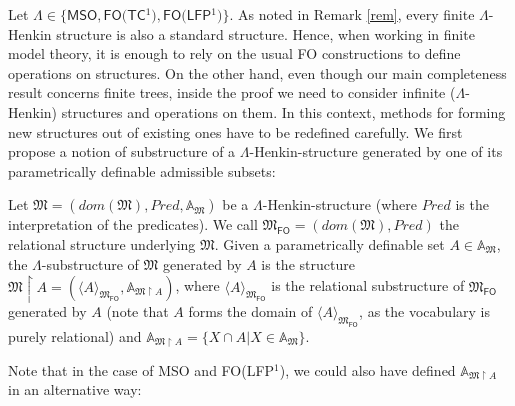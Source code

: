\documentclass{LMCS}
\newcommand{\frM}{\mathfrak{M}}
\newcommand{\fo}{\textsf{FO}\xspace}
\newcommand{\mso}{\textsf{MSO}\xspace}
\newcommand{\fotc}{\textsf{FO(TC$^1$)}\xspace}
\newcommand{\folfp}{\textsf{FO(LFP$^1$)}\xspace}
\begin{document}
Let $\Lambda \in \{\mso,\fotc,\folfp\}$. As noted in Remark \ref{rem}, every finite $\Lambda$-Henkin structure is also a standard structure.
Hence, when working in finite model theory, it is enough to rely on the usual \fo constructions to define operations on structures.
On the other hand, even though our main completeness result concerns finite trees, inside the proof we need to consider infinite ($\Lambda$-Henkin) structures and operations on them. In this context, methods for forming new structures out of existing ones have to be redefined carefully.
We first propose a notion of substructure of a $\Lambda$-Henkin-structure
generated by one of its parametrically definable admissible subsets:
\begin{defi}
    Let $\frM=(dom(\frM),Pred,\mathbb{A}_\frM)$ be a $\Lambda$-Henkin-structure (where $Pred$ is the interpretation of the predicates). We
    call $\frM_\fo=(dom(\frM), Pred)$ the relational structure underlying $\frM$. Given a parametrically definable set $A \in \mathbb{A}_\frM$, the
    $\Lambda$-substructure of $\frM$ generated by $A$ is the structure $\frM \upharpoonright A=(\langle A \rangle_{\frM_\fo},\mathbb{A}_{\frM \upharpoonright A})$,
where $\langle A \rangle_{\frM_\fo}$ is the relational substructure of
$\frM_\fo$ generated by $A$ (note that $A$ forms the domain of
$\langle A \rangle_{\frM_\fo}$, as the vocabulary is purely
relational) and $\mathbb{A}_{\frM \upharpoonright A}= \{X \cap A | X \in \mathbb{A}_\frM\}$.
\label{sub}
\end{defi}


Note that in the case of \mso and \folfp, we could also have defined $\mathbb{A}_{\frM \upharpoonright A}$ in an alternative way:
\end{document}
